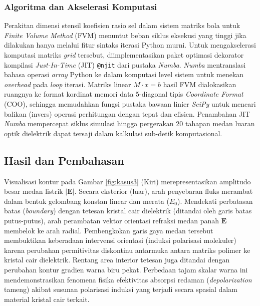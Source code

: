 \documentclass[11pt,a4paper]{article}
\begin{document}
\subsubsection{Algoritma dan Akselerasi Komputasi}
Perakitan dimensi stensil koefisien rasio sel dalam sistem matriks bola untuk \textit{Finite Volume Method} (FVM) menuntut beban siklus eksekusi yang tinggi jika dilakukan hanya melalui fitur sintaks iterasi Python murni. Untuk mengakselerasi komputasi matriks \textit{grid} tersebut, diimplementasikan paket optimasi dekorator kompilasi \textit{Just-In-Time} (JIT) \texttt{@njit} dari pustaka \textit{Numba}. \textit{Numba} mentranslasi bahasa operasi \textit{array} Python ke dalam komputasi level sistem untuk menekan \textit{overhead} pada \textit{loop} iterasi. Matriks linear $M \cdot x = b$ hasil FVM dialokasikan ruangnya ke format kordinat memori data 5-diagonal tipis \textit{Coordinate Format} (COO), sehingga memudahkan fungsi pustaka bawaan linier \textit{SciPy} untuk mencari balikan (invers) operasi perhitungan dengan tepat dan efisien. Penambahan JIT \textit{Numba} mempercepat siklus simulasi hingga pergerakan 20 tahapan medan luaran optik dielektrik dapat tersaji dalam kalkulasi sub-detik komputasional.

\subsection{Hasil dan Pembahasan}

Visualisasi kontur pada Gambar \ref{fig:kasus3} (Kiri) merepresentasikan amplitudo besar medan listrik $|\mathbf{E}|$. Secara eksterior (luar), arah penyebaran fluks merambat dalam bentuk gelombang konstan linear dan merata ($E_0$). Mendekati perbatasan batas (\textit{boundary}) dengan tetesan kristal cair dielektrik (ditandai oleh garis batas putus-putus), arah perambatan vektor orientasi refraksi medan panah $\mathbf{E}$ membelok ke arah radial. Pembengkokan garis gaya medan tersebut membuktikan keberadaan intervensi orientasi (induksi polarisasi molekuler) karena perubahan permitivitas diskontinu antarmuka antara matriks polimer ke kristal cair dielektrik. Rentang area interior tetesan juga ditandai dengan perubahan kontur gradien warna biru pekat. Perbedaan tajam skalar warna ini mendemonstrasikan fenomena fisika efektivitas absorpsi redaman (\textit{depolarization} tameng) akibat susunan polarisasi induksi yang terjadi secara spasial dalam material kristal cair terkait.
\end{document}
